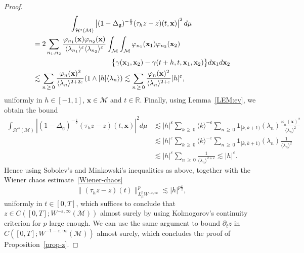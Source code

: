 \documentclass[AHL,Unicode,longabstracts,published]{cedram}
\renewcommand{\th}{\tau_h}
\newcommand{\R}{\mathbb{R}}
\newcommand{\x}{\mathbf{x}}
\newcommand{\ind}{\mathbf{1}}
\newcommand{\M}{\mathcal{M}}
\renewcommand{\H}{\mathcal{H}}
\newcommand{\g}{\mathfrak{g}}
\newcommand{\Dlg}{\Delta_{\g}}
\newcommand{\eps}{\varepsilon}
\newcommand{\dt}{\partial_t}
\newcommand{\les}{\lesssim}
\newcommand{\jb}[1] {\langle #1 \rangle}
\begin{document}
\begin{proof}
\begin{multline*}
\int_{\H^s(\M)}\left|(1-\Dlg)^{-\frac\eps2}(\th z-z)(t,\x)\right|^2d\mu\\
\begin{aligned}
& =2\sum_{n_1,n_2}\frac{\varphi_{n_1}(\x)\varphi_{n_2}(\x)}{\jb{\lambda_{n_1}}^{\eps}\jb{\lambda_{n_2}}^{\eps}}\int_{\M}\int_{\M}\varphi_{n_1}(\x_1)\varphi_{n_2}(\x_2)\\
&\mkern200mu\big\{\gamma(\x_1,\x_2)-\gamma(t+h,t,\x_1,\x_2)\big\}d\x_1d\x_2\\
&\les \sum_{n\,\geq\,0}\frac{\varphi_n(\x)^2}{\jb{\lambda_n}^{2+2\eps}}(1\wedge |h|\jb{\lambda_n}) \les \sum_{n\,\geq\,0} \frac{\varphi_n(\x)^2}{\jb{\lambda_n}^{2+\eps}} |h|^{\eps},
\end{aligned}
\end{multline*}
uniformly in $h\in [-1,1]$, $\x\in\M$ and $t\in\R$. Finally, using Lemma~\ref{LEM:ev}, we obtain the bound
\begin{align*}
\int_{\H^s(\M)}\left|(1-\Dlg)^{-\frac\eps2}(\th z-z)(t,\x)\right|^2d\mu &\les |h|^{\eps}\sum_{k\,\geq\,0}\jb{k}^{-\eps} \sum_{n\,\geq\,0} \ind_{[k,k+1)}(\lambda_n)\frac{\varphi_n(\x)^2}{\jb{\lambda_n}^{2}}\\
&\les |h|^{\eps}\sum_{k\,\geq\,0}\jb{k}^{-\eps} \sum_{n\,\geq\,0} \ind_{[k,k+1)}(\lambda_n)\frac{1}{\jb{\lambda_n}^{2}}\\
&\les |h|^{\eps}\sum_{n\,\geq\,0} \frac{1}{\jb{\lambda_n}^{2+\eps}}\les |h|^{\eps}.
\end{align*}
Hence using Sobolev's and Minkowski's inequalities as above, together with the Wiener chaos estimate~\eqref{Wiener-chaos}
\begin{equation}\label{kolmogorov}
\|(\th z-z)(t)\|_{L^p_{\mu}W^{-\eps,\infty} }^p \les |h|^{p\frac{\eps}{2}},
\end{equation}
uniformly in $t\in[0,T]$, which suffices to conclude that $z\in C([0,T];W^{-\eps,\infty}(\M))$ almost surely by using Kolmogorov's continuity criterion for $p$ large enough. We can use the same argument to bound $\dt z$ in $C([0,T];W^{-1-\eps,\infty}(\M))$ almost surely, which concludes the proof of Proposition~\ref{prop-z}.
\end{proof}
\end{document}
